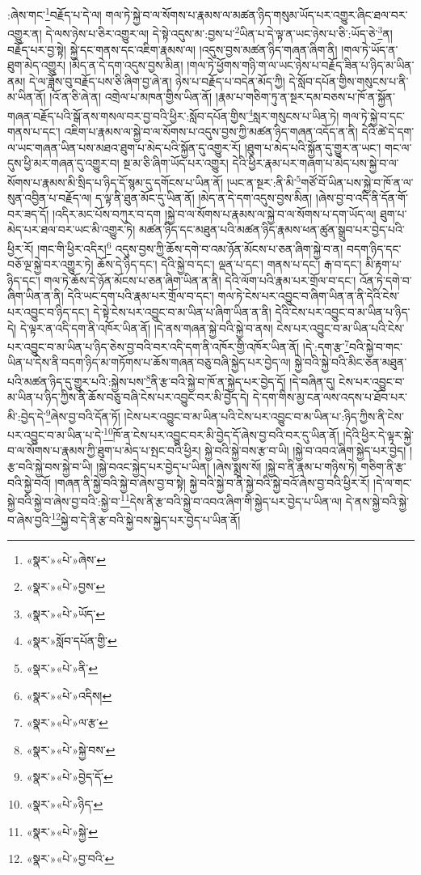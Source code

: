 :ཞེས་གང་\footnote{«སྣར་»«པེ་»ཞེས་}བརྗོད་པ་དེ་ལ། གལ་ཏེ་སྐྱེ་བ་ལ་སོགས་པ་རྣམས་ལ་མཚན་ཉིད་གསུམ་ཡོད་པར་འགྱུར་ཞིང་ཐལ་བར་འགྱུར་ན། དེ་ལས་ཉེས་པ་ཅིར་འགྱུར་ལ། དེ་སྟེ་འདུས་མ་:བྱས་པ་\footnote{«སྣར་»«པེ་»བྱས་}ཡིན་པ་དེ་ལྟ་ན་ཡང་ཉེས་པ་ཅི་:ཡོད་ཅེ་\footnote{«སྣར་»«པེ་»ཡོད་}ན། བརྗོད་པར་བྱ་སྟེ། སྐྱེ་དང་གནས་དང་འཇིག་རྣམས་ལ། །འདུས་བྱས་མཚན་ཉིད་གཞན་ཞིག་ནི། །གལ་ཏེ་ཡོད་ན་ཐུག་མེད་འགྱུར། །མེད་ན་དེ་དག་འདུས་བྱས་མིན། །གལ་ཏེ་ཕྱོགས་གཉི་ག་ལ་ཡང་ཉེས་པ་བརྗོད་ཟིན་པ་ཉིད་མ་ཡིན་ནམ། དེ་ལ་ཟློས་བུ་བརྗོད་པས་ཅི་ཞིག་བྱ་ཞེ་ན། ཉེས་པ་བརྗོད་པ་བདེན་མོད་ཀྱི། དེ་སློབ་དཔོན་གྱིས་གསུངས་པ་ནི་མ་ཡིན་ནོ། །འོ་ན་ཅི་ཞེ་ན། འགྲེལ་པ་མཁན་གྱིས་ཡིན་ནོ། །རྣམ་པ་གཅིག་ཏུ་ན་སྔར་དམ་བཅས་པ་ཁོ་ན་སྐྱོན་གཞན་བརྗོད་པའི་སྒོ་ནས་གསལ་བར་བྱ་བའི་ཕྱིར་:སློབ་དཔོན་གྱིས་\footnote{«སྣར་»སློབ་དཔོན་གྱི་}སླར་གསུངས་པ་ཡིན་ཏེ། གལ་ཏེ་སྐྱེ་བ་དང་གནས་པ་དང་། འཇིག་པ་རྣམས་ལ་སྐྱེ་བ་ལ་སོགས་པ་འདུས་བྱས་ཀྱི་མཚན་ཉིད་གཞན་འདོད་ན་ནི། དེའི་ཚེ་དེ་དག་ལ་ཡང་གཞན་ཡིན་པས་མཐའ་ཐུག་པ་མེད་པའི་སྐྱོན་དུ་འགྱུར་རོ། །ཐུག་པ་མེད་པའི་སྐྱོན་དུ་གྱུར་ན་ཡང་། གང་ལ་དུས་ཕྱི་མར་གཞན་དུ་འགྱུར་བ། སྔ་མ་ཅི་ཞིག་ཡོད་པར་འགྱུར། དེའི་ཕྱིར་རྣམ་པར་གཞག་པ་མེད་པས་སྐྱེ་བ་ལ་སོགས་པ་རྣམས་མི་སྲིད་པ་ཉིད་དོ་སྙམ་དུ་དགོངས་པ་ཡིན་ནོ། །ཡང་ན་སྔར་:ནི་མི་\footnote{«སྣར་»«པེ་»ནི་}གཙོ་བོ་ཡིན་པས་སྐྱེ་བ་ཁོ་ན་ལ་སུན་འབྱིན་པ་བརྗོད་ལ། ད་ལྟ་ནི་ཐུན་མོང་དུ་ཡིན་ནོ། །མེད་ན་དེ་དག་འདུས་བྱས་མིན། །ཞེས་བྱ་བ་འདི་ནི་དོན་གོ་བར་ཟད་དོ། །འདིར་མང་པོས་བཀུར་བ་དག །སྐྱེ་བ་ལ་སོགས་པ་རྣམས་ལ་སྐྱེ་བ་ལ་སོགས་པ་དག་ཡོད་ལ། ཐུག་པ་མེད་པར་ཐལ་བར་ཡང་མི་འགྱུར་ཏེ། མཚན་ཉིད་དང་མཐུན་པའི་མཚན་ཉིད་རྣམས་ཕན་ཚུན་སྒྲུབ་པར་བྱེད་པའི་ཕྱིར་རོ། །གང་གི་ཕྱིར་འདིར།\footnote{«སྣར་»«པེ་»འདིས།} འདུས་བྱས་ཀྱི་ཆོས་དགེ་བ་འམ་ཉོན་མོངས་པ་ཅན་ཞིག་སྐྱེ་བ་ན། བདག་ཉིད་དང་བཅོ་ལྔ་སྐྱེ་བར་འགྱུར་ཏེ། ཆོས་དེ་ཉིད་དང་། དེའི་སྐྱེ་བ་དང་། ལྡན་པ་དང་། གནས་པ་དང་། རྒ་བ་དང་། མི་རྟག་པ་ཉིད་དང་། གལ་ཏེ་ཆོས་དེ་ཉོན་མོངས་པ་ཅན་ཞིག་ཡིན་ན་ནི། དེའི་ལོག་པའི་རྣམ་པར་གྲོལ་བ་དང་། འོན་ཏེ་དགེ་བ་ཞིག་ཡིན་ན་ནི། དེའི་ཡང་དག་པའི་རྣམ་པར་གྲོལ་བ་དང་། གལ་ཏེ་ངེས་པར་འབྱུང་བ་ཞིག་ཡིན་ན་ནི་དེའི་ངེས་པར་འབྱུང་བ་ཉིད་དང་། དེ་སྟེ་ངེས་པར་འབྱུང་བ་མ་ཡིན་པ་ཞིག་ཡིན་ན་ནི། དེའི་ངེས་པར་འབྱུང་བ་མ་ཡིན་པ་ཉིད་དེ། དེ་ལྟར་ན་འདི་དག་ནི་འཁོར་ཡིན་ནོ། །དེ་ནས་གཞན་སྐྱེ་བའི་སྐྱེ་བ་ནས། ངེས་པར་འབྱུང་བ་མ་ཡིན་པའི་ངེས་པར་འབྱུང་བ་མ་ཡིན་པ་ཉིད་ཅེས་བྱ་བའི་བར་འདི་དག་ནི་འཁོར་གྱི་འཁོར་ཡིན་ནོ། །དེ་:དག་རྩ་\footnote{«སྣར་»«པེ་»ལ་རྩ་}བའི་སྐྱེ་བ་གང་ཡིན་པ་དེས་ནི་བདག་ཉིད་མ་གཏོགས་པ་ཆོས་གཞན་བཅུ་བཞི་སྐྱེད་པར་བྱེད་ལ། སྐྱེ་བའི་སྐྱེ་བའི་མིང་ཅན་མཐུན་པའི་མཚན་ཉིད་དུ་གྱུར་པའི་:སྐྱེས་པས་\footnote{«སྣར་»«པེ་»སྐྱེ་བས་}ནི་རྩ་བའི་སྐྱེ་བ་ཁོ་ན་སྐྱེད་པར་བྱེད་དོ། །དེ་བཞིན་དུ། ངེས་པར་འབྱུང་བ་མ་ཡིན་པ་ཉིད་ཀྱིས་ནི་ཆོས་བཅུ་བཞི་ངེས་པར་འབྱུང་བར་མི་བྱེད་དེ། དེ་དག་གིས་མྱ་ངན་ལས་འདས་པ་ཐོབ་པར་མི་:བྱེད་དེ་\footnote{«སྣར་»«པེ་»བྱེད་དོ་}ཞེས་བྱ་བའི་དོན་ཏོ། །ངེས་པར་འབྱུང་བ་མ་ཡིན་པའི་ངེས་པར་འབྱུང་བ་མ་ཡིན་པ་:ཉིད་ཀྱིས་ནི་ངེས་པར་འབྱུང་བ་མ་ཡིན་པ་དེ་\footnote{«སྣར་»«པེ་»ཉིད་}ཁོ་ན་ངེས་པར་འབྱུང་བར་མི་བྱེད་དོ་ཞེས་བྱ་བའི་བར་དུ་ཡིན་ནོ། །དེའི་ཕྱིར་དེ་ལྟར་སྐྱེ་བ་ལ་སོགས་པ་རྣམས་ཀྱི་ཐུག་པ་མེད་པ་སྤང་བའི་ཕྱིར། སྐྱེ་བའི་སྐྱེ་བས་རྩ་བ་ཡི། །སྐྱེ་བ་འབའ་ཞིག་སྐྱེད་པར་བྱེད། །རྩ་བའི་སྐྱེ་བས་སྐྱེ་བ་ཡི། །སྐྱེ་བའང་སྐྱེད་པར་བྱེད་པ་ཡིན། །ཞེས་སྨྲས་སོ། །སྐྱེ་བ་ནི་རྣམ་པ་གཉིས་ཏེ། གཅིག་ནི་རྩ་བའི་སྐྱེ་བའོ། །གཞན་ནི་སྐྱེ་བའི་སྐྱེ་བ་ཞེས་བྱ་བ་སྟེ། སྐྱེ་བའི་སྐྱེ་བ་ནི་སྐྱེ་བའི་སྐྱེ་བའོ་ཞེས་བྱ་བའི་ཕྱིར་རོ། །དེ་ལ་གང་སྐྱེ་བའི་སྐྱེ་བ་ཞེས་བྱ་བའི་:སྐྱེ་བ་\footnote{«སྣར་»«པེ་»སྐྱེ་}དེས་ནི་རྩ་བའི་སྐྱེ་བ་འབའ་ཞིག་གི་སྐྱེད་པར་བྱེད་པ་ཡིན་ལ། དེ་ནས་སྐྱེ་བའི་སྐྱེ་བ་ཞེས་བྱའི་\footnote{«སྣར་»«པེ་»བྱ་བའི་}སྐྱེ་བ་དེ་ནི་རྩ་བའི་སྐྱེ་བས་སྐྱེད་པར་བྱེད་པ་ཡིན་ནོ། 
